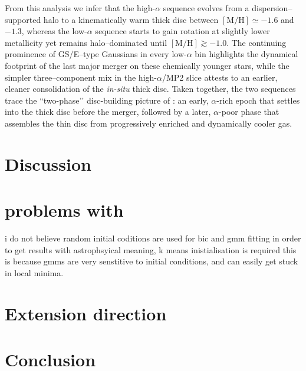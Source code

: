 \documentclass[a4paper,12pt]{article}
\begin{document}
 
From this analysis we infer that the high-$\alpha$ sequence evolves from a dispersion–supported 
halo to a kinematically warm thick disc between $[\mathrm{M/H}]\simeq-1.6$ and $-1.3$, whereas 
the low-$\alpha$ sequence starts to gain rotation at slightly lower metallicity yet remains 
halo–dominated until $[\mathrm{M/H}]\gtrsim-1.0$.  
The continuing prominence of GS/E–type Gaussians in every low-$\alpha$ bin highlights the dynamical 
footprint of the last major merger on these chemically younger stars, while the simpler three–component 
mix in the high-$\alpha$/MP2 slice attests to an earlier, cleaner consolidation of the \textit{in-situ} thick disc.  
Taken together, the two sequences trace the “two-phase’’ disc‐building picture of \citet{Haywood2013}: 
an early, $\alpha$-rich epoch that settles into the thick disc before 
the merger, followed by a later, $\alpha$-poor phase that assembles the thin disc from progressively 
enriched and dynamically cooler gas.



\section{Discussion} \label{sec:discussion}







\section{problems with \citet{zhang2024existencemetalpoordiscmilky}}

i do not believe random initial coditions are used for bic and gmm fitting
in order to get results with astrophsyical meaning, k means inistialisation is required
this is because gmms are very senstitive to initial conditions, and can easily get stuck in local minima.

\section{Extension direction}

\section{Conclusion}



\newpage


\end{document}

